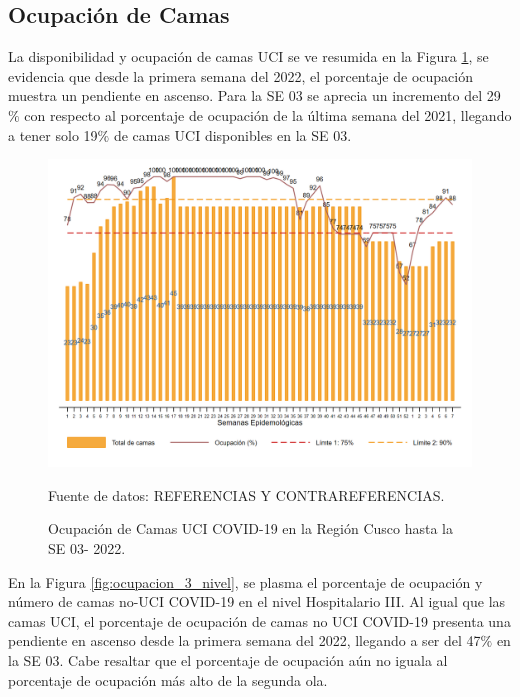 \documentclass[12pt,a4paper,openany]{book}
\begin{document}
\clearpage
\subsection*{Ocupación de Camas}
\noindent La disponibilidad y ocupación de camas UCI se ve resumida en la Figura \ref{fig:ocupacion_uci}, se evidencia que desde la primera semana del 2022, el porcentaje de ocupación muestra un pendiente en ascenso. Para la SE 03 se aprecia un incremento del 29$\%$ con respecto al porcentaje de ocupación de la última semana del 2021, llegando a tener solo 19$\%$ de camas UCI disponibles en la SE 03.    

\begin{figure}[h]
	\caption{Ocupación de Camas UCI COVID-19 en la Región Cusco hasta la SE 03- 2022.}\label{fig:ocupacion_uci}
	\begin{center}
		\includegraphics[width=0.95\linewidth]{../figuras/uci.png}
	\end{center}
	{\footnotesize {Fuente de datos: REFERENCIAS Y CONTRAREFERENCIAS.}}
\end{figure}
\cleardoublepage

En la Figura \ref{fig:ocupacion_3_nivel}, se plasma el porcentaje de ocupación y número de camas no-UCI COVID-19 en el nivel Hospitalario III. Al igual que las camas UCI, el porcentaje de ocupación de camas no UCI COVID-19 presenta una pendiente en ascenso desde la primera semana del 2022, llegando a ser del  47$\%$ en la SE 03. Cabe resaltar que el porcentaje de ocupación aún no iguala al porcentaje de ocupación más alto de la segunda ola.  
  
\end{document}
